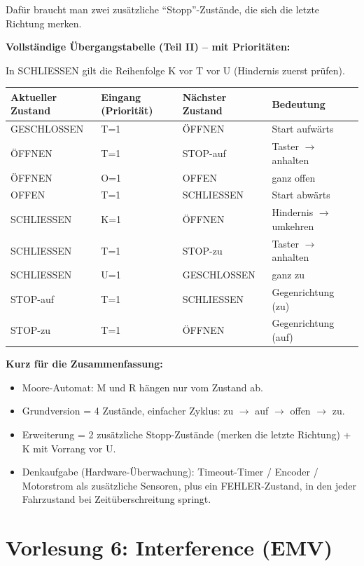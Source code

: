 \documentclass[11pt,a4paper]{article}
\begin{document}
Dafür braucht man zwei zusätzliche ``Stopp''-Zustände, die sich die letzte Richtung merken.

\textbf{Vollständige Übergangstabelle (Teil II) -- mit Prioritäten:}

In SCHLIESSEN gilt die Reihenfolge K vor T vor U (Hindernis zuerst prüfen).

\begin{center}
\begin{tabular}{lll l}
    \toprule
    Aktueller Zustand & Eingang (Priorität) & Nächster Zustand & Bedeutung \\ \midrule
    GESCHLOSSEN & T=1 & ÖFFNEN & Start aufwärts \\
    ÖFFNEN & T=1 & STOP-auf & Taster $\to$ anhalten \\
    ÖFFNEN & O=1 & OFFEN & ganz offen \\
    OFFEN & T=1 & SCHLIESSEN & Start abwärts \\
    SCHLIESSEN & K=1 & ÖFFNEN & Hindernis $\to$ umkehren \\
    SCHLIESSEN & T=1 & STOP-zu & Taster $\to$ anhalten \\
    SCHLIESSEN & U=1 & GESCHLOSSEN & ganz zu \\
    STOP-auf & T=1 & SCHLIESSEN & Gegenrichtung (zu) \\
    STOP-zu & T=1 & ÖFFNEN & Gegenrichtung (auf) \\ \bottomrule
\end{tabular}
\end{center}

\textbf{Kurz für die Zusammenfassung:}
\begin{itemize}
    \item Moore-Automat: M und R hängen nur vom Zustand ab.
    \item Grundversion = 4 Zustände, einfacher Zyklus: zu $\to$ auf $\to$ offen $\to$ zu.
    \item Erweiterung = 2 zusätzliche Stopp-Zustände (merken die letzte Richtung) + K mit Vorrang vor U.
    \item Denkaufgabe (Hardware-Überwachung): Timeout-Timer / Encoder / Motorstrom als zusätzliche Sensoren, plus ein FEHLER-Zustand, in den jeder Fahrzustand bei Zeitüberschreitung springt.
\end{itemize}

\newpage
\section{Vorlesung 6: Interference (EMV)}
\end{document}
